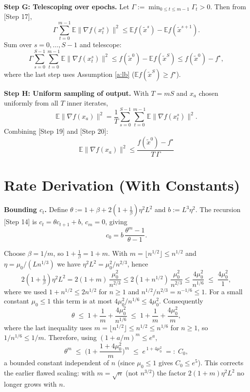 \documentclass[11pt]{article}
\begin{document}
\textbf{Step G: Telescoping over epochs.}
Let $\Gamma := \min_{0\le t\le m-1}\Gamma_t > 0$. Then from [Step 17],
\[
\Gamma\sum_{t=0}^{m-1}\mathbb{E}\|\nabla f(x_t^s)\|^2
\le \mathbb{E}f(\tilde{x}^s) - \mathbb{E}f(\tilde{x}^{s+1}).
\tag*{[Step 18]}
\]
Sum over $s=0,\dots,S-1$ and telescope:
\[
\Gamma\sum_{s=0}^{S-1}\sum_{t=0}^{m-1}\mathbb{E}\|\nabla f(x_t^s)\|^2
\le f(\tilde{x}^0) - \mathbb{E}f(\tilde{x}^S) \le f(\tilde{x}^0) - f^\star,
\tag*{[Step 19]}
\]
where the last step uses Assumption \ref{a:lb} ($\mathbb{E}f(\tilde{x}^S)\ge f^\star$).

\textbf{Step H: Uniform sampling of output.}
With $T=mS$ and $x_a$ chosen uniformly from all $T$ inner iterates,
\[
\mathbb{E}\|\nabla f(x_a)\|^2 = \frac{1}{T}\sum_{s=0}^{S-1}\sum_{t=0}^{m-1}\mathbb{E}\|\nabla f(x_t^s)\|^2.
\tag*{[Step 20]}
\]
Combining [Step 19] and [Step 20]:
\[
\boxed{\;\mathbb{E}\|\nabla f(x_a)\|^2 \le \frac{f(\tilde{x}^0)-f^\star}{T\,\Gamma}\;}
\tag*{[Step 21]}
\]

\section*{Rate Derivation (With Constants)}


\textbf{Bounding $c_t$.}
Define $\theta := 1+\beta + 2(1+\tfrac1\beta)\eta^2 L^2$ and $b:=L^3\eta^2$.
The recursion [Step 14] is $c_t = \theta c_{t+1} + b$, $c_m=0$, giving
\[
c_0 = b\,\frac{\theta^{m}-1}{\theta-1}.
\tag*{[Step 22]}
\]

Choose $\beta = 1/m$, so $1+\tfrac1\beta = 1+m$. With $m=\lfloor n^{1/2}\rfloor \le n^{1/2}$
and $\eta = \mu_0/(L n^{1/3})$ we have $\eta^2 L^2 = \mu_0^2/n^{2/3}$, hence
\[
2(1+\tfrac1\beta)\eta^2 L^2 = 2(1+m)\,\frac{\mu_0^2}{n^{2/3}}
\le 2(1+n^{1/2})\,\frac{\mu_0^2}{n^{2/3}}
\le \frac{4\mu_0^2}{n^{1/6}}\;\le\; \frac{4\mu_0^2}{1},
\tag*{[Step 23a]}
\]
where we used $1+n^{1/2}\le 2n^{1/2}$ for $n\ge1$ and $n^{1/2}/n^{2/3}=n^{-1/6}\le 1$.
For a small constant $\mu_0\le 1$ this term is at most $4\mu_0^2/n^{1/6}\le 4\mu_0^2$.
Consequently
\[
\theta \;\le\; 1 + \frac1m + \frac{4\mu_0^2}{n^{1/6}}
\;\le\; 1 + \frac{1}{m} + \frac{4\mu_0^2}{m},
\tag*{[Step 23b]}
\]
where the last inequality uses $m=\lfloor n^{1/2}\rfloor \le n^{1/2}\le n^{1/6}$ for
$n\ge1$, so $1/n^{1/6}\le 1/m$. Therefore, using $(1+a/m)^m\le e^{a}$,
\[
\theta^m \;\le\; \Big(1 + \frac{1+4\mu_0^2}{m}\Big)^{m} \;\le\; e^{\,1+4\mu_0^2} \;=:\; C_0,
\tag*{[Step 23]}
\]
a bounded constant independent of $n$ (since $\mu_0\le 1$ gives $C_0\le e^5$).
This corrects the earlier flawed scaling: with $m=\sqrt{n}$ (not $n^{3/2}$) the
factor $2(1+m)\eta^2L^2$ no longer grows with $n$.
\end{document}
